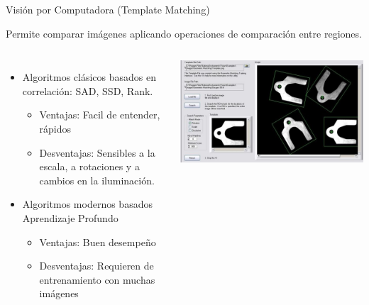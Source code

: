 \begin{frame}{Visión por Computadora (Template Matching)}

Permite comparar imágenes aplicando operaciones de comparación entre regiones.
\begin{columns}
  \begin{itemize}
    \item Algoritmos clásicos basados en correlación: SAD, SSD, Rank.
	  \begin{itemize}
		    \item Ventajas: Facil de entender, rápidos
		    \item Desventajas: Sensibles a la escala, a rotaciones y a cambios en la iluminación. 
	  \end{itemize}
    \item Algoritmos modernos basados Aprendizaje Profundo
		\begin{itemize}
		    \item Ventajas: Buen desempeño 
		    \item Desventajas: Requieren de entrenamiento con muchas imágenes
	  \end{itemize}

  \end{itemize}
        \begin{center}
            \includegraphics[width=\textwidth]{00_IntroComputerVision/figs/Industrial-software-example-for-Template-Matching_W640}\\
     \end{center}

    \end{columns}
\end{frame}


